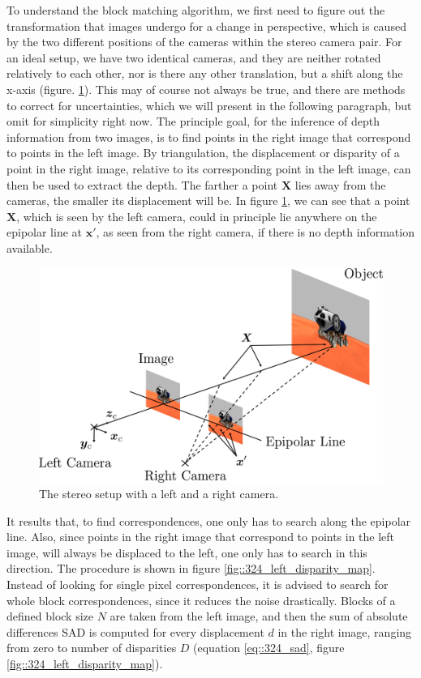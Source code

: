 To understand the block matching algorithm, we first need to figure out the transformation that images undergo for a change in perspective, which is caused by the two different positions of the cameras within the stereo camera pair. For an ideal setup, we have two identical cameras, and they are neither rotated relatively to each other, nor is there any other translation, but a shift along the x-axis (figure. \ref{fig::324_stereo_camera}). This may of course not always be true, and there are methods to correct for uncertainties, which we will present in the following paragraph, but omit for simplicity right now. The principle goal, for the inference of depth information from two images, is to find points in the right image that correspond to points in the left image. By triangulation, the displacement or disparity of a point in the right image, relative to its corresponding point in the left image, can then be used to extract the depth. The farther a point $\bm{X}$ lies away from the cameras, the smaller its displacement will be. In figure \ref{fig::324_stereo_camera}, we can see that a point $\bm{X}$, which is seen by the left camera, could in principle lie anywhere on the epipolar line at $\bm{x}'$, as seen from the right camera, if there is no depth information available. 
\begin{figure}[h]
	\centering
	\includegraphics[scale=.28]{chapters/03_background/img/stereo_camera.png}
	\caption{The stereo setup with a left and a right camera.}
	\label{fig::324_stereo_camera}
\end{figure}
It results that, to find correspondences, one only has to search along the epipolar line. Also, since points in the right image that correspond to points in the left image, will always be displaced to the left, one only has to search in this direction. The procedure is shown in figure \ref{fig::324_left_disparity_map}. Instead of looking for single pixel correspondences, it is advised to search for whole block correspondences, since it reduces the noise drastically. Blocks of a defined block size $N$ are taken from the left image, and then the sum of absolute differences SAD is computed for every displacement $d$ in the right image, ranging from zero to number of disparities $D$ (equation \ref{eq::324_sad}, figure \ref{fig::324_left_disparity_map}).
